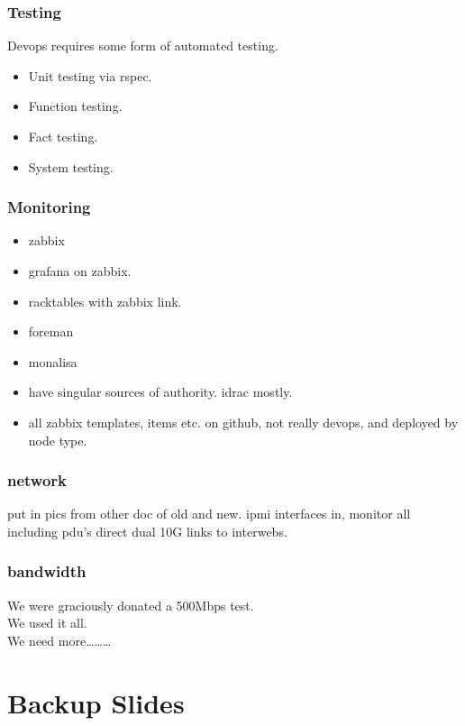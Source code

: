 \documentclass{beamer}
\begin{document}
\begin{frame}
  \frametitle{Testing}
  Devops requires some form of automated testing.
  \begin{itemize}
    \item Unit testing via rspec.
    \item Function testing.
    \item Fact testing.
    \item System testing.
  \end{itemize}
\end{frame}

\begin{frame}
  \frametitle{Monitoring}
  \begin{itemize}
    \item zabbix
    \item grafana on zabbix.
    \item racktables with zabbix link.
    \item foreman
    \item monalisa
    \item have singular sources of authority. idrac mostly.
    \item all zabbix templates, items etc. on github, not really devops, and deployed by node type.
  \end{itemize}
\end{frame}

\begin{frame}
  \frametitle{network}
  put in pics from other doc of old and new.
  ipmi interfaces in, monitor all including pdu's
  direct dual 10G links to interwebs.
\end{frame}

\begin{frame}
  \frametitle{bandwidth}
  We were graciously donated a 500Mbps test.\\
  We used it all.\\
  We need more\ldots\ldots\ldots
\end{frame}



\section{Backup Slides}
\end{document}
